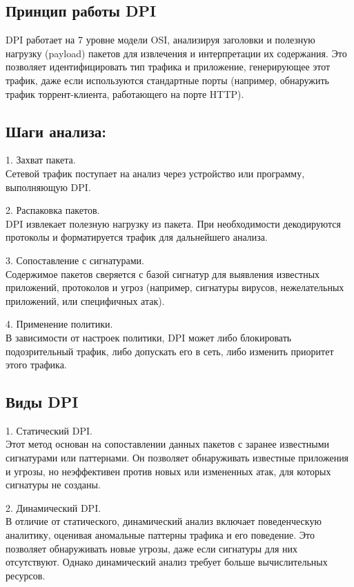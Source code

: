 \documentclass[utf8,14pt,a4paper,oneside,russian]{book}
\begin{document}
\subsection{Принцип работы DPI}

DPI работает на 7 уровне модели OSI, анализируя заголовки и полезную нагрузку (payload) пакетов для извлечения и интерпретации их содержания.
Это позволяет идентифицировать тип трафика и приложение, генерирующее этот трафик, даже если используются стандартные порты (например,
обнаружить трафик торрент-клиента, работающего на порте HTTP).

\subsection{Шаги анализа:}
1. Захват пакета.\\
Сетевой трафик поступает на анализ через устройство или программу, выполняющую DPI.

2. Распаковка пакетов.\\
DPI извлекает полезную нагрузку из пакета. При необходимости декодируются протоколы и форматируется трафик для дальнейшего анализа.

3. Сопоставление с сигнатурами.\\
Содержимое пакетов сверяется с базой сигнатур для выявления известных приложений, протоколов и угроз (например, сигнатуры вирусов,
нежелательных приложений, или специфичных атак).

4. Применение политики.\\
В зависимости от настроек политики, DPI может либо блокировать подозрительный трафик, либо допускать его в сеть, либо изменить приоритет этого
трафика.

\subsection{Виды DPI}

1. Статический DPI.\\
Этот метод основан на сопоставлении данных пакетов с заранее известными сигнатурами или паттернами. Он позволяет обнаруживать известные приложения
и угрозы, но неэффективен против новых или измененных атак, для которых сигнатуры не созданы.

2. Динамический DPI.\\
В отличие от статического, динамический анализ включает поведенческую аналитику, оценивая аномальные паттерны трафика и его поведение.
Это позволяет обнаруживать новые угрозы, даже если сигнатуры для них отсутствуют. Однако динамический анализ требует больше вычислительных
ресурсов.
\end{document}

